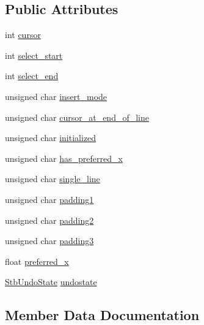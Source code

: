 \subsection*{Public Attributes}
\begin{DoxyCompactItemize}
\item 
int \mbox{\hyperlink{struct_s_t_b___textedit_state_a7a1414f3286070306a5184f9473ccf9f}{cursor}}
\item 
int \mbox{\hyperlink{struct_s_t_b___textedit_state_a74d595403e0b6f99cd0163ee87f4344d}{select\+\_\+start}}
\item 
int \mbox{\hyperlink{struct_s_t_b___textedit_state_abf8b1b1064770e4579c5bb8c4a41d8f0}{select\+\_\+end}}
\item 
unsigned char \mbox{\hyperlink{struct_s_t_b___textedit_state_af26029a4f1f76d043afd35072fabcb4b}{insert\+\_\+mode}}
\item 
unsigned char \mbox{\hyperlink{struct_s_t_b___textedit_state_a0e7ba5f610f5dc2d643bef0f223ada9c}{cursor\+\_\+at\+\_\+end\+\_\+of\+\_\+line}}
\item 
unsigned char \mbox{\hyperlink{struct_s_t_b___textedit_state_a11a63150e95225aacd204d6ef160c0c0}{initialized}}
\item 
unsigned char \mbox{\hyperlink{struct_s_t_b___textedit_state_aaca2d581ed565f86288038816274e007}{has\+\_\+preferred\+\_\+x}}
\item 
unsigned char \mbox{\hyperlink{struct_s_t_b___textedit_state_a63299aca2cb4e009dfa41cda5e651316}{single\+\_\+line}}
\item 
unsigned char \mbox{\hyperlink{struct_s_t_b___textedit_state_a1e43e8ac88a8c7f2bba645b333a8bdc7}{padding1}}
\item 
unsigned char \mbox{\hyperlink{struct_s_t_b___textedit_state_af5a708e49f23f79bb14c9b0f4ad03371}{padding2}}
\item 
unsigned char \mbox{\hyperlink{struct_s_t_b___textedit_state_a4c42530e4919171df25b1f00bb95a887}{padding3}}
\item 
float \mbox{\hyperlink{struct_s_t_b___textedit_state_a527319df94e0fe262548fb48bebf3dea}{preferred\+\_\+x}}
\item 
\mbox{\hyperlink{struct_stb_undo_state}{Stb\+Undo\+State}} \mbox{\hyperlink{struct_s_t_b___textedit_state_a7e1f0366bbd57e01a4f49a720beb9ead}{undostate}}
\end{DoxyCompactItemize}


\subsection{Member Data Documentation}
\mbox{\label{struct_s_t_b___textedit_state_a7a1414f3286070306a5184f9473ccf9f}} 

